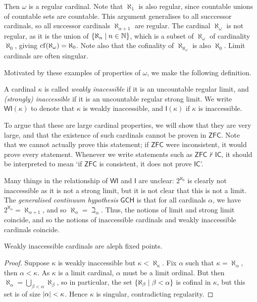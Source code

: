 \begin{enumerate}
    Then \( \omega \) is a regular cardinal.
    Note that \( \aleph_1 \) is also regular, since countable unions of countable sets are countable.
    This argument generalises to all succcessor cardinals, so all successor cardinals \( \aleph_{\alpha + 1} \) are regular.
    The cardinal \( \aleph_\omega \) is not regular, as it is the union of \( \qty{\aleph_n \mid n \in \mathbb N} \), which is a subset of \( \aleph_\omega \) of cardinality \( \aleph_0 \), giving \( \operatorname{cf}(\aleph_\omega) = \aleph_0 \).
    Note also that the cofinality of \( \aleph_{\aleph_\omega} \) is also \( \aleph_0 \).
    Limit cardinals are often singular.
\end{enumerate}

Motivated by these examples of properties of \( \omega \), we make the following definition.

\begin{definition}
    A cardinal \( \kappa \) is called \emph{weakly inacessible} if it is an uncountable regular limit, and \emph{(strongly) inaccessible} if it is an uncountable regular strong limit.
    We write \( \mathsf{WI}(\kappa) \) to denote that \( \kappa \) is weakly inaccessible, and \( \mathsf{I}(\kappa) \) if \( \kappa \) is inaccessible.
\end{definition}

To argue that these are large cardinal properties, we will show that they are very large, and that the existence of such cardinals cannot be proven in \( \mathsf{ZFC} \).
Note that we cannot actually prove this statement; if \( \mathsf{ZFC} \) were inconsistent, it would prove every statement.
Whenever we write statements such as \( \mathsf{ZFC} \nvdash \mathsf{IC} \), it should be interpreted to mean `if \( \mathsf{ZFC} \) is consistent, it does not prove \( \mathsf{IC} \)'.

Many things in the relationship of \( \mathsf{WI} \) and \( \mathsf{I} \) are unclear: \( 2^{\aleph_0} \) is clearly not inaccessible as it is not a strong limit, but it is not clear that this is not a limit.
The \emph{generalised continuum hypothesis} \( \mathsf{GCH} \) is that for all cardinals \( \alpha \), we have \( 2^{\aleph_\alpha} = \aleph_{\alpha + 1} \), and so \( \aleph_\alpha = \beth_\alpha \).
Thus, the notions of limit and strong limit coincide, and so the notions of inaccessible cardinals and weakly inaccessible cardinals coincide.

\begin{proposition}
    Weakly inaccessible cardinals are aleph fixed points.
\end{proposition}
\begin{proof}
    Suppose \( \kappa \) is weakly inaccessible but \( \kappa < \aleph_\kappa \).
    Fix \( \alpha \) such that \( \kappa = \aleph_\alpha \), then \( \alpha < \kappa \).
    As \( \kappa \) is a limit cardinal, \( \alpha \) must be a limit ordinal.
    But then \( \aleph_\alpha = \bigcup_{\beta < \alpha} \aleph_\beta \), so in particular, the set \( \qty{\aleph_\beta \mid \beta < \alpha} \) is cofinal in \( \kappa \), but this set is of size \( \abs{\alpha} < \kappa \).
    Hence \( \kappa \) is singular, contradicting regularity.
\end{proof}

